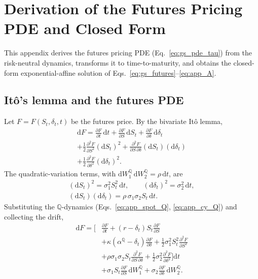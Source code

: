 \documentclass[sigconf, authorversion=true, nonacm=true]{acmart}
\newcommand{\convyield}{\delta}             %
\newcommand{\meanrev}{\kappa}               %
\newcommand{\longrun}{\alpha}               %
\begin{document}
\section{Derivation of the Futures Pricing PDE and Closed Form}
\label{app:gs_pde}

This appendix derives the futures pricing PDE (Eq.~\ref{eq:gs_pde_tau}) from the risk-neutral dynamics, transforms it to time-to-maturity, and obtains the closed-form exponential-affine solution of Eqs.~\ref{eq:gs_futures}--\ref{eq:app_A}.

\subsection{It\^{o}'s lemma and the futures PDE}

Let $F = F(S_t, \convyield_t, t)$ be the futures price. By the bivariate It\^{o} lemma,
\begin{equation}
  \label{eq:app_ito}
  \begin{multlined}
  \mathrm{d}F = \frac{\partial F}{\partial t}\,\mathrm{d}t
    + \frac{\partial F}{\partial S}\,\mathrm{d}S_t
    + \frac{\partial F}{\partial \convyield}\,\mathrm{d}\convyield_t \\
    + \frac{1}{2}\frac{\partial^2 F}{\partial S^2}(\mathrm{d}S_t)^2
    + \frac{\partial^2 F}{\partial S\,\partial \convyield}(\mathrm{d}S_t)(\mathrm{d}\convyield_t) \\
    + \frac{1}{2}\frac{\partial^2 F}{\partial \convyield^2}(\mathrm{d}\convyield_t)^2.
  \end{multlined}
\end{equation}
\noindent
The quadratic-variation terms, with $\mathrm{d}W_1^{\mathbb{Q}}\,\mathrm{d}W_2^{\mathbb{Q}} = \rho\,\mathrm{d}t$, are
\begin{equation}
  \label{eq:app_qv}
  \begin{gathered}
  (\mathrm{d}S_t)^2 = \sigma_1^2 S_t^2\,\mathrm{d}t,
  \qquad
  (\mathrm{d}\convyield_t)^2 = \sigma_2^2\,\mathrm{d}t, \\
  (\mathrm{d}S_t)(\mathrm{d}\convyield_t) = \rho\,\sigma_1\sigma_2 S_t\,\mathrm{d}t.
  \end{gathered}
\end{equation}
\noindent
Substituting the $\mathbb{Q}$-dynamics (Eqs.~\ref{eq:app_spot_Q}, \ref{eq:app_cy_Q}) and collecting the drift,
\begin{equation}
  \label{eq:app_dF}
  \begin{aligned}
  \mathrm{d}F = \Bigg[
    &\frac{\partial F}{\partial t}
    + (r - \convyield_t)S_t\frac{\partial F}{\partial S} \\
    &+ \meanrev(\longrun^{\mathbb{Q}} - \convyield_t)\frac{\partial F}{\partial \convyield}
    + \frac{1}{2}\sigma_1^2 S_t^2\frac{\partial^2 F}{\partial S^2} \\
    &+ \rho\sigma_1\sigma_2 S_t\frac{\partial^2 F}{\partial S\,\partial \convyield}
    + \frac{1}{2}\sigma_2^2\frac{\partial^2 F}{\partial \convyield^2}
  \Bigg]\mathrm{d}t \\
  &+ \sigma_1 S_t\frac{\partial F}{\partial S}\,\mathrm{d}W_1^{\mathbb{Q}}
  + \sigma_2\frac{\partial F}{\partial \convyield}\,\mathrm{d}W_2^{\mathbb{Q}}.
  \end{aligned}
\end{equation}
\end{document}
